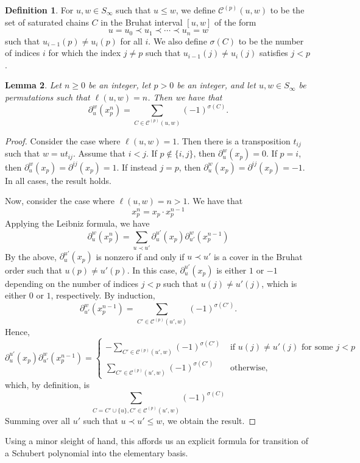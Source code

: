 \documentclass{amsart}
\newtheorem{lemma}{Lemma}[subsection]
\theoremstyle{definition}
\newtheorem{definition}[lemma]{Definition}
\theoremstyle{remark}
\numberwithin{equation}{subsection}
\begin{document}
\newcommand{\achain}[1]{\mathcal{C}^{(#1)}}
\begin{definition}
For $u,w\in S_\infty$ such that $u\leq w$, we define $\achain{p}(u,w)$ to be the set of saturated chains $C$ in the Bruhat interval $[u,w]$ of the form
$$u=u_0\prec u_1\prec \cdots \prec u_n=w$$  
such that $u_{i-1}(p)\neq u_i(p)$ for all $i$. We also define $\sigma(C)$ to be the number of indices $i$ for which the index $j\neq p$ such that $u_{i-1}(j)\neq u_i(j)$ satisfies $j<p$.
\end{definition}

\begin{lemma} \label{lemma:powerdiff}
Let $n\geq 0$ be an integer, let $p>0$ be an integer, and let $u, w\in S_\infty$ be permutations such that $\ell(u,w)=n$. Then we have that 
$$\partial_u^w(x_p^n) = \sum_{C\in \achain{p}(u,w)} (-1)^{\sigma(C)}.$$
\end{lemma}
\begin{proof}

  

Consider the case where $\ell(u,w)=1$. Then there is a transposition $t_{ij}$ such that $w = ut_{ij}$. Assume that $i<j$. If $p\notin\{i,j\}$, then $\partial_u^w(x_p)=0$. If $p=i$, then $\partial_u^w(x_p) = \partial^{ij}(x_p) = 1$. If instead $j=p$, then $\partial_u^w(x_p) = \partial^{ij}(x_p) = -1$. In all cases, the result holds.

Now, consider the case where $\ell(u,w)=n>1$. We have that
$$x_p^n = x_p\cdot x_p^{n-1}$$
Applying the Leibniz formula, we have
$$\partial_u^w(x_p^n) = \sum_{u\prec u'}\partial_u^{u'}(x_p)\partial_{u'}^w(x_p^{n-1})$$
By the above, $\partial_u^{u'}(x_p)$ is nonzero if and only if $u\prec u'$ is a cover in the Bruhat order such that $u(p)\neq u'(p)$. In this case, $\partial_u^{u'}(x_p)$ is either $1$ or $-1$ depending on the number of indices $j<p$ such that $u(j)\neq u'(j)$, which is either $0$ or $1$, respectively. By induction, 
$$\partial_{u'}^w(x_p^{n-1}) = \sum_{C'\in \achain{p}(u',w)} (-1)^{\sigma(C')}.$$
Hence, 
$$\partial_u^{u'}(x_p)\partial_{u'}^w(x_p^{n-1})=\begin{cases}
-\displaystyle\sum_{C'\in \achain{p}(u',w)} (-1)^{\sigma(C')}&\mbox{ if }u(j)\neq u'(j)\mbox{ for some }j<p\\
\displaystyle\sum_{C'\in \achain{p}(u',w)} (-1)^{\sigma(C')}&\mbox{ otherwise,}
\end{cases}$$
which, by definition, is
$$\sum_{C=C'\cup\{u\}, C'\in \achain{p}(u',w)} (-1)^{\sigma(C)}$$
Summing over all $u'$ such that $u\prec u'\leq w$, we obtain the result.
\end{proof}
Using a minor sleight of hand, this affords us an explicit formula for transition of a Schubert polynomial into the elementary basis.
\end{document}
